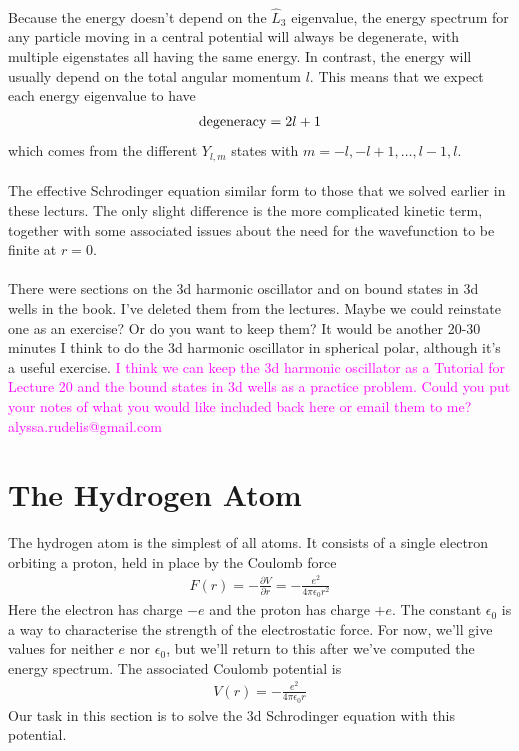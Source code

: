 \documentclass[12pt]{article}
\def\be{\begin{eqnarray}}
\def\ee{\end{eqnarray}}
\newcommand{\nn}{\nonumber}
\newcommand\para{\paragraph{}}
\newcommand{\ppp}[2]{\frac{\partial {#1}}{\partial {#2}}}
\newcommand{\co}{\color{olive}}
\newcommand{\cblue}{\color{blue}}
\newcommand{\alyssa}{\textcolor{magenta}}
\begin{document}
{\para
{\co Because the energy doesn't depend on the $\hat{L}_3$ eigenvalue,  the energy spectrum for any particle moving in a central potential will always be degenerate, with multiple eigenstates all having the same energy. In contrast, the energy will usually depend on the total angular momentum $l$. This means that we expect each energy eigenvalue to have 
%
\be {\rm degeneracy} = 2l+1\nn\ee
%
which comes from the different $Y_{l,m}$ states with $m=-l,-l+1,\ldots, l-1,l$.}


\para
The effective Schrodinger equation similar form to those that we solved earlier in these lecturs.  The only slight difference is the more complicated kinetic term, together with some associated issues about the need for the wavefunction to be finite at $r=0$. 



\para
{\cblue There were sections on the 3d harmonic oscillator and on bound states in 3d wells in the book. I've deleted them from the lectures. Maybe we could reinstate one as an exercise? Or do you want to keep them? It would be another 20-30 minutes I think to do the 3d harmonic oscillator in spherical polar, although it's a useful exercise.} \alyssa{I think we can keep the 3d harmonic oscillator as a Tutorial for Lecture 20 and the bound states in 3d wells as a practice problem. Could you put your notes of what you would like included back here or email them to me? alyssa.rudelis@gmail.com}



\newpage
\section{The Hydrogen Atom}

The hydrogen atom is the simplest of all atoms. {\co It consists of a single electron orbiting a proton, held in place by the Coulomb force
%
\be F(r) = -\ppp{V}{r}= -\frac{e^2}{4\pi \epsilon_0r^2}\nn\ee
%
Here the electron has charge $-e$ and the proton has charge $+e$. The constant $\epsilon_0$ is a way to characterise the strength of the electrostatic force.} For now, we'll give values for neither  $e$ nor $\epsilon_0$, but we'll return to this after we've computed the energy spectrum.  {\co The associated Coulomb potential is 
%
\be V(r) = -\frac{e^2}{4\pi\epsilon_0 r}\nn\ee
%
}
Our task in this section is to solve the 3d Schrodinger equation with this potential.

}
\end{document}
